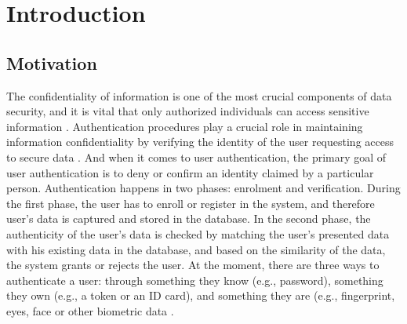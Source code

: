\chapter{Introduction}
\label{ch:introduction}
\section{Motivation}
\label{sec:Introduction:Motivation}
The confidentiality of information is one of the most crucial components of data security, and it is vital that only authorized individuals can access sensitive information \cite{al2021ensuring}. Authentication procedures play a crucial role in maintaining information confidentiality by verifying the identity of the user requesting access to secure data \cite{jayarathne2016brainid}. And when it comes to user authentication, the primary goal of user authentication is to deny or confirm an identity claimed by a particular person. Authentication happens in two phases: enrolment and verification. During the first phase, the user has to enroll or register in the system, and therefore user's data is captured and stored in the database. In the second phase, the authenticity of the user's data is checked by matching the user's presented data with his existing data in the database, and based on the similarity of the data, the system grants or rejects the user. 
At the moment, there are three ways to authenticate a user: through something they know (e.g., password), something they own (e.g., a token or an ID card), and something they are (e.g., fingerprint, eyes, face or other biometric data \cite{grassi2017draft}. 
\smallskip

